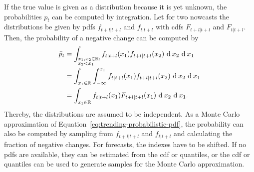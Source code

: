 If the true value is given as a distribution because it is yet unknown, the probabilities $p_t$ can be computed by integration.
Let for two nowcasts the distributions be given by \acp{pdf} $f_{t+l|t+l}$ and $f_{t|t+l}$ with \acp{cdf}  $F_{t+l|t+l}$ and $F_{t|t+l}$.
Then, the probability of a negative change can be computed by
\begin{align}
    \bar{p}_t
        &= \int_{\begin{subarray}{l}x_1, x_2 \in \R: \\ x_2 < x_1\end{subarray}} f_{t|t+l} (x_1) f_{t+l|t+l} (x_2)  \ \textrm{d} \: x_2 \ \textrm{d} \: x_1 \nonumber\\
        &= \int_{x_1 \in \R} \int_{-\infty}^{x_1} f_{t|t+l} (x_1) f_{t+l|t+l} (x_2)  \ \textrm{d} \: x_2 \ \textrm{d} \: x_1 \nonumber\\
        &= \int_{x_1 \in \R} f_{t|t+l} (x_1) F_{t+l|t+l} (x_1)  \ \textrm{d} \: x_2 \ \textrm{d} \: x_1 \label{eq:trending-probabilistic-pdf}.
\end{align}
Thereby, the distributions are assumed to be independent.
As a Monte Carlo approximation of Equation~\eqref{eq:trending-probabilistic-pdf}, the probability can also be computed by sampling from $f_{t+l|t+l}$ and $f_{t|t+l}$ and calculating the fraction of negative changes.
For forecasts, the indexes have to be shifted.
If no \acp{pdf} are available, they can be estimated from the \ac{cdf} or quantiles, or the \ac{cdf} or quantiles can be used to generate samples for the Monte Carlo approximation.
